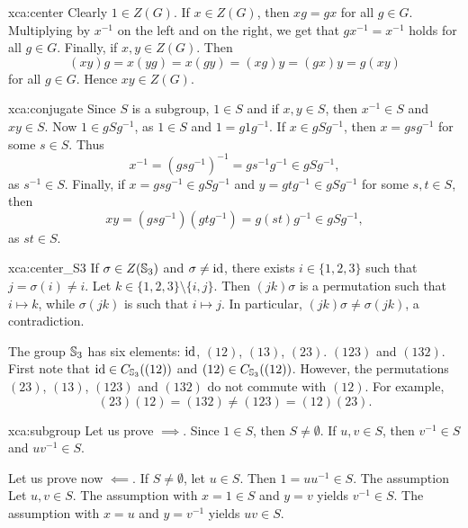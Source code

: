 \begin{sol}{xca:center}
    Clearly $1\in Z(G)$. If $x\in Z(G)$, then $xg=gx$ for all $g\in G$. Multiplying by $x^{-1}$ on the left and 
    on the right, we get that $gx^{-1}=x^{-1}$ holds for all $g\in G$. Finally, if $x,y\in Z(G)$. Then
    \[
    (xy)g=x(yg)=x(gy)=(xg)y=(gx)y=g(xy)
    \]
    for all $g\in G$. Hence $xy\in Z(G)$. 
\end{sol}


\begin{sol}{xca:conjugate}
    Since $S$ is a subgroup, $1\in S$ and 
    if $x,y\in S$, then $x^{-1}\in S$ and $xy\in S$. Now 
    $1\in gSg^{-1}$, as $1\in S$ and $1=g1g^{-1}$. If $x\in gSg^{-1}$, then 
    $x=gsg^{-1}$ for some $s\in S$. Thus 
    \[
    x^{-1}=(gsg^{-1})^{-1}=gs^{-1}g^{-1}\in gSg^{-1},
    \]
    as $s^{-1}\in S$. Finally, 
    if $x=gsg^{-1}\in gSg^{-1}$ and $y=gtg^{-1}\in gSg^{-1}$ for some $s,t\in S$, then 
    \[
    xy=(gsg^{-1})(gtg^{-1})=g(st)g^{-1}\in gSg^{-1},
    \]
    as $st\in S$. 
\end{sol}

\begin{sol}{xca:center_S3}
    If $\sigma\in Z(\mathbb{S}_3)$ and $\sigma\ne\operatorname{id}$, there exists $i\in\{1,2,3\}$ such that 
    $j=\sigma(i)\ne i$. Let $k\in\{1,2,3\}\setminus\{i,j\}$. Then 
    $(jk)\sigma$ is a permutation such that $i\mapsto k$, while 
    $\sigma(jk)$ is such that $i\mapsto j$. In particular, $(jk)\sigma\ne\sigma(jk)$, a contradiction.

    The group $\mathbb{S}_3$ has six elements: $\operatorname{id}$, $(12)$, $(13)$, $(23)$. $(123)$ and $(132)$. 
    First note that $\operatorname{id}\in C_{\mathbb{S}_3}((12))$ and 
    $(12)\in C_{\mathbb{S}_3}((12))$. However, 
    the permutations $(23)$, $(13)$, $(123)$ and $(132)$ do not commute with
    $(12)$. For example, 
    \[
    (23)(12)=(132)\ne (123)=(12)(23).
    \]
\end{sol}

\begin{sol}{xca:subgroup}
    Let us prove $\implies$. Since $1\in S$, then $S\ne\emptyset$. If $u,v\in S$, then 
    $v^{-1}\in S$ and $uv^{-1}\in S$. 

    Let us prove now $\impliedby$. If $S\ne\emptyset$, let $u\in S$. Then $1=uu^{-1}\in S$. The assumption 
    Let $u,v\in S$. The assumption with $x=1\in S$ and $y=v$ yields $v^{-1}\in S$. The assumption 
    with $x=u$ and $y=v^{-1}$ yields $uv\in S$. 
\end{sol}

